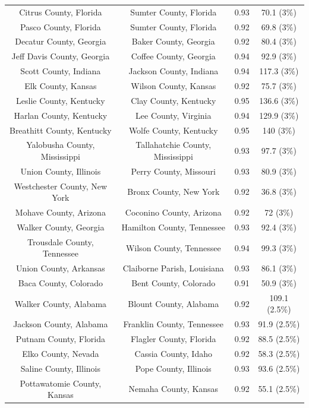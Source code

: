\begin{longtable}{cccc}
  Citrus County, Florida & Sumter County, Florida & 0.93 & 70.1 (3\%) \\ 
  Pasco County, Florida & Sumter County, Florida & 0.92 & 69.8 (3\%) \\ 
  Decatur County, Georgia & Baker County, Georgia & 0.92 & 80.4 (3\%) \\ 
  Jeff Davis County, Georgia & Coffee County, Georgia & 0.94 & 92.9 (3\%) \\ 
  Scott County, Indiana & Jackson County, Indiana & 0.94 & 117.3 (3\%) \\ 
  Elk County, Kansas & Wilson County, Kansas & 0.92 & 75.7 (3\%) \\ 
  Leslie County, Kentucky & Clay County, Kentucky & 0.95 & 136.6 (3\%) \\ 
  Harlan County, Kentucky & Lee County, Virginia & 0.94 & 129.9 (3\%) \\ 
  Breathitt County, Kentucky & Wolfe County, Kentucky & 0.95 & 140 (3\%) \\ 
  Yalobusha County, Mississippi & Tallahatchie County, Mississippi & 0.93 & 97.7 (3\%) \\ 
  Union County, Illinois & Perry County, Missouri & 0.93 & 80.9 (3\%) \\ 
  Westchester County, New York & Bronx County, New York & 0.92 & 36.8 (3\%) \\ 
  Mohave County, Arizona & Coconino County, Arizona & 0.92 & 72 (3\%) \\ 
  Walker County, Georgia & Hamilton County, Tennessee & 0.93 & 92.4 (3\%) \\ 
  Trousdale County, Tennessee & Wilson County, Tennessee & 0.94 & 99.3 (3\%) \\ 
  Union County, Arkansas & Claiborne Parish, Louisiana & 0.93 & 86.1 (3\%) \\ 
  Baca County, Colorado & Bent County, Colorado & 0.91 & 50.9 (3\%) \\ 
  Walker County, Alabama & Blount County, Alabama & 0.92 & 109.1 (2.5\%) \\ 
  Jackson County, Alabama & Franklin County, Tennessee & 0.93 & 91.9 (2.5\%) \\ 
  Putnam County, Florida & Flagler County, Florida & 0.92 & 88.5 (2.5\%) \\ 
  Elko County, Nevada & Cassia County, Idaho & 0.92 & 58.3 (2.5\%) \\ 
  Saline County, Illinois & Pope County, Illinois & 0.93 & 93.6 (2.5\%) \\ 
  Pottawatomie County, Kansas & Nemaha County, Kansas & 0.92 & 55.1 (2.5\%) \\ 

\end{longtable}
